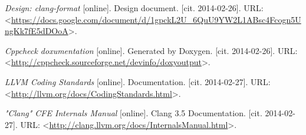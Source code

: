 \begin{thebibliography}{99}
	\emph{Design: clang-format} [online].
	Design document.
	[cit. 2014-02-26].
	URL: <\url{https://docs.google.com/document/d/1gpckL2U_6QuU9YW2L1ABsc4Fcogn5UngKk7fE5dDOoA}>.
	
	\emph{Cppcheck doxumentation} [online].
	Generated by Doxygen.
	[cit. 2014-02-26].
	URL: <\url{http://cppcheck.sourceforge.net/devinfo/doxyoutput}>.
	
	\emph{LLVM Coding Standards} [online].
	Documentation.
	[cit. 2014-02-27].
	URL: <\url{http://llvm.org/docs/CodingStandards.html}>.
	
	\emph{"Clang" CFE Internals Manual} [online].
	Clang 3.5 Documentation.
	[cit. 2014-02-27].
	URL: <\url{http://clang.llvm.org/docs/InternalsManual.html}>.
  
\end{thebibliography}
